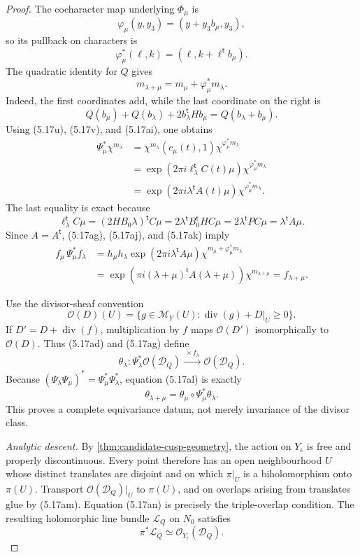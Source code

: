 \begin{proof}
The cocharacter map underlying \(\Phi_\mu\) is
\[
 \varphi_\mu(y,y_3)=(y+y_3b_\mu,y_3),
\]
so its pullback on characters is
\[
 \varphi_\mu^*(\ell,k)
 =(\ell,k+\ell^{\mathsf t}b_\mu).
\tag{5.17ai}
\]
The quadratic identity for \(Q\) gives
\[
 m_{\lambda+\mu}=m_\mu+\varphi_\mu^*m_\lambda.
\tag{5.17aj}
\]
Indeed, the first coordinates add, while the last coordinate on the
right is
\[
 Q(b_\mu)+Q(b_\lambda)+2b_\lambda^{\mathsf t}Hb_\mu
 =Q(b_\lambda+b_\mu).
\]
Using (5.17u), (5.17v), and (5.17ai), one obtains
\begin{align*}
 \Psi_\mu^*\chi^{m_\lambda}
 &=\chi^{m_\lambda}(c_\mu(t),1)
   \chi^{\varphi_\mu^*m_\lambda}\\
 &=\exp\!\left(2\pi i\ell_\lambda^{\mathsf t}C(t)\mu\right)
   \chi^{\varphi_\mu^*m_\lambda}\\
 &=\exp\!\left(2\pi i\lambda^{\mathsf t}A(t)\mu\right)
   \chi^{\varphi_\mu^*m_\lambda}.
\tag{5.17ak}
\end{align*}
The last equality is exact because
\[
 \ell_\lambda^{\mathsf t}C\mu
 =(2HB_0\lambda)^{\mathsf t}C\mu
 =2\lambda^{\mathsf t}B_0^{\mathsf t}HC\mu
 =2\lambda^{\mathsf t}PC\mu
 =\lambda^{\mathsf t}A\mu.
\]
Since \(A=A^{\mathsf t}\), (5.17ag), (5.17aj), and (5.17ak) imply
\begin{align*}
 f_\mu\,\Psi_\mu^*f_\lambda
 &=h_\mu h_\lambda
   \exp(2\pi i\lambda^{\mathsf t}A\mu)
   \chi^{m_\mu+\varphi_\mu^*m_\lambda}\\
 &=\exp\!\left(
   \pi i(\lambda+\mu)^{\mathsf t}A(\lambda+\mu)\right)
   \chi^{m_{\lambda+\mu}}
 =f_{\lambda+\mu}.
\tag{5.17al}
\end{align*}

Use the divisor-sheaf convention
\[
 \mathcal O(D)(U)=
 \{g\in\mathcal M_Y(U):
   \operatorname{div}(g)+D|_U\geq0\}.
\]
If \(D'=D+\operatorname{div}(f)\), multiplication by \(f\) maps
\(\mathcal O(D')\) isomorphically to \(\mathcal O(D)\).  Thus
(5.17ad) and (5.17ag) define
\[
 \theta_\lambda:
 \Psi_\lambda^*\mathcal O(\mathcal D_Q)
 \xrightarrow{\ \times f_\lambda\ }
 \mathcal O(\mathcal D_Q).
\tag{5.17am}
\]
Because
\((\Psi_\lambda\Psi_\mu)^*=\Psi_\mu^*\Psi_\lambda^*\),
equation (5.17al) is exactly
\[
 \theta_{\lambda+\mu}
 =\theta_\mu\circ\Psi_\mu^*\theta_\lambda.
\tag{5.17an}
\]
This proves a complete equivariance datum, not merely invariance of the
divisor class.

\emph{Analytic descent.}
By \cref{thm:candidate-cusp-geometry}, the action on \(Y_\epsilon\) is
free and properly discontinuous.  Every point therefore has an open
neighbourhood \(U\) whose distinct translates are disjoint and on which
\(\pi|_U\) is a biholomorphism onto \(\pi(U)\).  Transport
\(\mathcal O(\mathcal D_Q)|_U\) to \(\pi(U)\), and on overlaps arising
from translates glue by (5.17am).  Equation (5.17an) is precisely the
triple-overlap condition.  The resulting holomorphic line bundle
\(\mathcal L_Q\) on \(N_0\) satisfies
\[
 \pi^*\mathcal L_Q
 \simeq\mathcal O_{Y_\epsilon}(\mathcal D_Q).
\tag{5.17ao}
\]


\end{proof}
